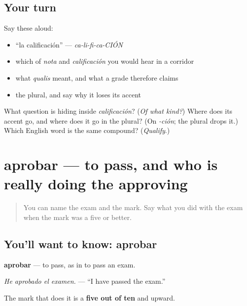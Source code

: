\subsection*{Your turn}
Say these aloud:

\begin{itemize}
\raggedright
  \item \textquotedblleft{}la calificación\textquotedblright{} — \emph{ca-li-fi-ca-CIÓN}
  \item which of \emph{nota} and \emph{calificación} you would hear in a corridor
  \item what \emph{qualis} meant, and what a grade therefore claims
  \item the plural, and say why it loses its accent
\end{itemize}

\begin{tcolorbox}[breakable,colback=teal!4,colframe=teal!35!black,title={Before you move on}]
What question is hiding inside \emph{calificación}? (\emph{Of what kind?}) Where does its accent go, and where does it go in the plural? (On \emph{-ción}; the plural drops it.) Which English word is the same compound? (\emph{Qualify}.)
\end{tcolorbox}
\section[aprobar]{aprobar — to pass, and who is really doing the approving}

\label{lesson:ES-C429-aprobar}



\begin{quote}
You can name the exam and the mark. Say what you did with the exam when the mark was a five or better.
\end{quote}

\subsection*{You'll want to know: aprobar}
\textbf{aprobar} — to pass, as in to pass an exam.

\emph{He aprobado el examen.} — \textquotedblleft{}I have passed the exam.\textquotedblright{}

The mark that does it is a \textbf{five out of ten} and upward.

